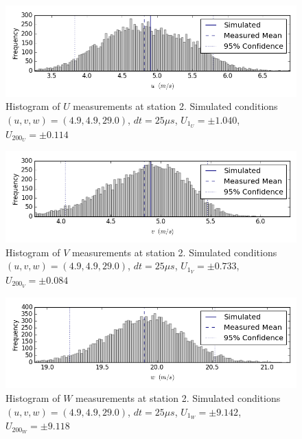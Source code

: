\begin{figure}[H]
\centering
\includegraphics[width=6in]{figs/Ely_May28th02001/uncertainty_Ely_May28th02001_U}
\caption{Histogram of $U$ measurements at station 2. Simulated conditions $(u,v,w)=(4.9, 4.9, 29.0)$, $dt=25 \mu s$, $U_{1_{U}}=\pm 1.040$, $U_{200_{U}}=\pm 0.114$}
\label{fig:uncertainty_Ely_May28th02001_U}
\end{figure}


\begin{figure}[H]
\centering
\includegraphics[width=6in]{figs/Ely_May28th02001/uncertainty_Ely_May28th02001_V}
\caption{Histogram of $V$ measurements at station 2. Simulated conditions $(u,v,w)=(4.9, 4.9, 29.0)$, $dt=25 \mu s$, $U_{1_{V}}=\pm 0.733$, $U_{200_{V}}=\pm 0.084$}
\label{fig:uncertainty_Ely_May28th02001_V}
\end{figure}


\begin{figure}[H]
\centering
\includegraphics[width=6in]{figs/Ely_May28th02001/uncertainty_Ely_May28th02001_W}
\caption{Histogram of $W$ measurements at station 2. Simulated conditions $(u,v,w)=(4.9, 4.9, 29.0)$, $dt=25 \mu s$, $U_{1_{W}}=\pm 9.142$, $U_{200_{W}}=\pm 9.118$}
\label{fig:uncertainty_Ely_May28th02001_W}
\end{figure}


